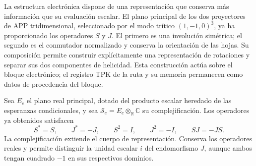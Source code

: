 La estructura electrónica dispone de una representación que conserva más
información que su evaluación escalar. El plano principal de los dos
proyectores de APP tridimensional, seleccionado por el modo trítico
\((1,-1,0)^3\), ya ha proporcionado los operadores \(S\) y \(J\).
El primero es una involución simétrica; el segundo es el conmutador
normalizado y conserva la orientación de las hojas. Su composición permite
construir explícitamente una representación de rotaciones y separar sus
dos componentes de helicidad. Esta construcción actúa sobre el bloque
electrónico; el registro TPK de la ruta y su memoria permanecen como datos
de procedencia del bloque.

Sea \(E_e\) el plano real principal, dotado del producto escalar heredado
de las esperanzas condicionales, y sea
\(\mathscr S_e=E_e\otimes_{\mathbb R}\mathbb C\) su complejificación.
Los operadores ya obtenidos satisfacen
\[
 S^*=S,\qquad J^*=-J,\qquad
 S^2=I,\qquad J^2=-I,\qquad SJ=-JS.
\]
La complejificación extiende el cuerpo de representación. Conserva los
operadores reales y permite distinguir la unidad escalar \(i\) del
endomorfismo \(J\), aunque ambos tengan cuadrado \(-1\) en sus
respectivos dominios.

